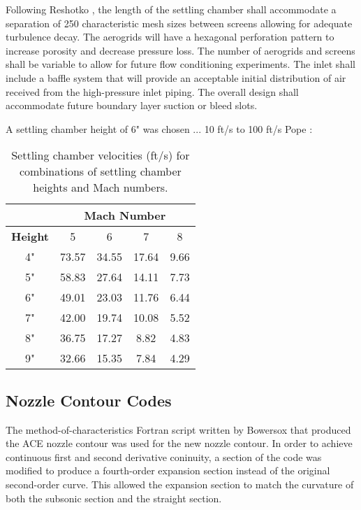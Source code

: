 Following Reshotko \cite{reshotko}, the length of the settling chamber shall accommodate a separation of 250 characteristic mesh sizes between screens allowing for adequate turbulence decay. The aerogrids will have a hexagonal perforation pattern to increase porosity and decrease pressure loss. The number of aerogrids and screens shall be variable to allow for future flow conditioning experiments. The inlet shall include a baffle system that will provide an acceptable initial distribution of air received from the high-pressure inlet piping. The overall design shall accommodate future boundary layer suction or bleed slots.

A settling chamber height of 6" was chosen ... 10 ft/s to 100 ft/s Pope \cite{pope}:

\begin{table}[h]
    \centering
    \label{tab:sc_vel}
    \begin{tabular}{|c|c|c|c|c|}
        \cline{2-5}
        \multicolumn{1}{c}{} & \multicolumn{4}{|c|}{\textbf{Mach Number}} \\ \hline
        \textbf{Height} & 5 & 6 & 7 & 8 \\ \hline
        4" & 73.57 & 34.55 & 17.64 & 9.66 \\ \hline
        5" & 58.83 & 27.64 & 14.11 & 7.73 \\ \hline \hline
        6" & 49.01 & 23.03 & 11.76 & 6.44 \\ \hline \hline
        7" & 42.00 & 19.74 & 10.08 & 5.52 \\ \hline
        8" & 36.75 & 17.27 & 8.82 & 4.83 \\ \hline
        9" & 32.66 & 15.35 & 7.84 & 4.29 \\ \hline
    \end{tabular}
    \caption{Settling chamber velocities (ft/s) for combinations of settling chamber heights and Mach numbers.}
\end{table}
    
\subsection{Nozzle Contour Codes}

The method-of-characteristics Fortran script written by Bowersox that produced the ACE nozzle contour was used for the new nozzle contour. In order to achieve continuous first and second derivative coninuity, a section of the code was modified to produce a fourth-order expansion section instead of the original second-order curve. This allowed the expansion section to match the curvature of both the subsonic section and the straight section.

